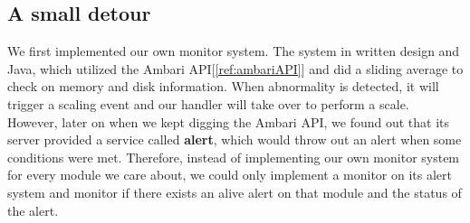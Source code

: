 \documentclass{article}
\begin{document}
\subsection{A small detour}
We first implemented our own monitor system. The system in written design and Java, which utilized the Ambari API[\ref{ref:ambariAPI}] and did a sliding average to check on memory and disk information. When abnormality is detected, it will trigger a scaling event and our handler will take over to perform a scale. However, later on when we kept digging the Ambari API, we found out that its server provided a service called \textbf{alert}, which would throw out an alert when some conditions were met. Therefore, instead of implementing our own monitor system for every module we care about, we could only implement a monitor on its alert system and monitor if there exists an alive alert on that module and the status of the alert.
\end{document}
